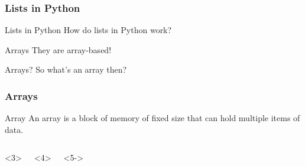 \begin{frame}
	\frametitle{Lists in Python}
	\begin{block}{Lists in Python}
		How do lists in Python work?
	\end{block}
	\pause
	\begin{block}{Arrays}
		They are array-based!
	\end{block}
	\pause
	\begin{block}{Arrays?}
		So what's an array then?
	\end{block}
\end{frame}

\begin{frame}
	\frametitle{Arrays}
	\begin{block}{Array}
		An array is a block of memory of fixed size that can hold multiple items of data.
	\end{block}	
	\pause
	\begin{columns}
		\vspace{10pt}
		\pause
		\begin{onlyenv}<3>

			
		\end{onlyenv}
		\begin{onlyenv}<4>

			
		\end{onlyenv}
		\begin{onlyenv}<5->

			
		\end{onlyenv}
	\end{columns}
\end{frame}

